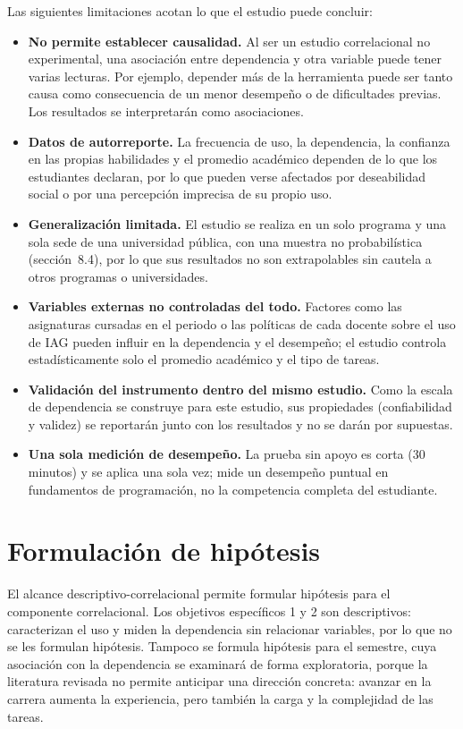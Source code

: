 \documentclass[12pt,letterpaper]{article}
\numberwithin{table}{section}
\numberwithin{figure}{section}
\begin{document}
Las siguientes limitaciones acotan lo que el estudio puede concluir:

\begin{itemize}
  \item \textbf{No permite establecer causalidad.} Al ser un estudio correlacional no experimental, una asociación entre dependencia y otra variable puede tener varias lecturas. Por ejemplo, depender más de la herramienta puede ser tanto causa como consecuencia de un menor desempeño o de dificultades previas. Los resultados se interpretarán como asociaciones.
  \item \textbf{Datos de autorreporte.} La frecuencia de uso, la dependencia, la confianza en las propias habilidades y el promedio académico dependen de lo que los estudiantes declaran, por lo que pueden verse afectados por deseabilidad social o por una percepción imprecisa de su propio uso.
  \item \textbf{Generalización limitada.} El estudio se realiza en un solo programa y una sola sede de una universidad pública, con una muestra no probabilística (sección~8.4), por lo que sus resultados no son extrapolables sin cautela a otros programas o universidades.
  \item \textbf{Variables externas no controladas del todo.} Factores como las asignaturas cursadas en el periodo o las políticas de cada docente sobre el uso de IAG pueden influir en la dependencia y el desempeño; el estudio controla estadísticamente solo el promedio académico y el tipo de tareas.
  \item \textbf{Validación del instrumento dentro del mismo estudio.} Como la escala de dependencia se construye para este estudio, sus propiedades (confiabilidad y validez) se reportarán junto con los resultados y no se darán por supuestas.
  \item \textbf{Una sola medición de desempeño.} La prueba sin apoyo es corta (30 minutos) y se aplica una sola vez; mide un desempeño puntual en fundamentos de programación, no la competencia completa del estudiante.
\end{itemize}

\section{Formulación de hipótesis}

El alcance descriptivo-correlacional permite formular hipótesis para el componente correlacional. Los objetivos específicos 1 y 2 son descriptivos: caracterizan el uso y miden la dependencia sin relacionar variables, por lo que no se les formulan hipótesis. Tampoco se formula hipótesis para el semestre, cuya asociación con la dependencia se examinará de forma exploratoria, porque la literatura revisada no permite anticipar una dirección concreta: avanzar en la carrera aumenta la experiencia, pero también la carga y la complejidad de las tareas.
\end{document}
